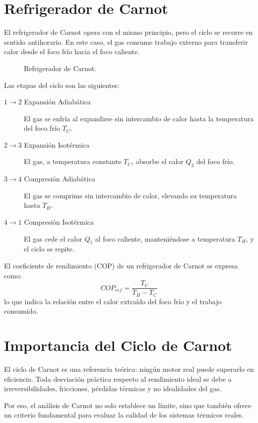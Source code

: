 \section{Refrigerador de Carnot}

El refrigerador de Carnot opera con el mismo principio, pero el ciclo se recorre en sentido antihorario.  
En este caso, el gas consume trabajo externo para transferir calor desde el foco frío hacia el foco caliente.

\begin{figure}[h]
    \centering
    \caption{Refrigerador de Carnot.}
    \label{fig:refrigerador-carnot}
\end{figure}

Las etapas del ciclo son las siguientes:

\begin{description}
    \item[$1\rightarrow 2$ Expansión Adiabática]  
    El gas se enfría al expandirse sin intercambio de calor hasta la temperatura del foco frío $T_C$.

    \item[$2\rightarrow 3$ Expansión Isotérmica]  
    El gas, a temperatura constante $T_C$, absorbe el calor $Q_2$ del foco frío.

    \item[$3\rightarrow 4$ Compresión Adiabática]  
    El gas se comprime sin intercambio de calor, elevando su temperatura hasta $T_H$.

    \item[$4\rightarrow 1$ Compresión Isotérmica]  
    El gas cede el calor $Q_1$ al foco caliente, manteniéndose a temperatura $T_H$, y el ciclo se repite.
\end{description}

El coeficiente de rendimiento (COP) de un refrigerador de Carnot se expresa como:
\[
COP_{ref} = \frac{T_C}{T_H - T_C}
\]
lo que indica la relación entre el calor extraído del foco frío y el trabajo consumido.

\section{Importancia del Ciclo de Carnot}

El ciclo de Carnot es una referencia teórica: ningún motor real puede superarlo en eficiencia.  
Toda desviación práctica respecto al rendimiento ideal se debe a irreversibilidades, fricciones, pérdidas térmicas y no idealidades del gas.

Por eso, el análisis de Carnot no solo establece un límite, sino que también ofrece un criterio fundamental para evaluar la calidad de los sistemas térmicos reales.
